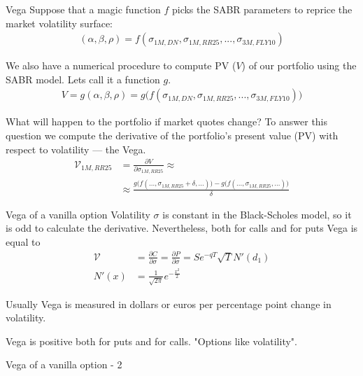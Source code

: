 \documentclass{beamer}
\begin{document}
\begin{frame}{Vega}
\justify
Suppose that a magic function $f$ picks the SABR parameters to reprice the market volatility surface:
\begin{align*}
(\alpha, \beta, \rho) = f(\sigma_{1M,DN}, \sigma_{1M,RR25}, ..., \sigma_{3M,FLY10})
\end{align*}

\justify
We also have a numerical procedure to compute PV ($V$) of our portfolio using the SABR model. Lets call it a function $g$.
\begin{align*}
V = g(\alpha, \beta, \rho) = g\Big(f(\sigma_{1M,DN}, \sigma_{1M,RR25}, ..., \sigma_{3M,FLY10})\Big)
\end{align*}

\justify
What will happen to the portfolio if market quotes change? To answer this question we compute the derivative of the portfolio's present value (PV) with respect to volatility --- the \alert{Vega}.
\begin{align*}
\mathcal{V}_{1M,RR25} &= \frac{\partial V}{\partial \sigma_{1M,RR25}} \approx \\
&\approx \frac{g\Big(f(...,\sigma_{1M,RR25}+\delta,...)\Big) - g\Big(f(...,\sigma_{1M,RR25},...)\Big)}{\delta}
\end{align*}
\end{frame}



\begin{frame}{Vega of a vanilla option}
\justify
Volatility $\sigma$ is constant in the Black-Scholes model, so it is odd to calculate the derivative. Nevertheless, both for calls and for puts Vega is equal to
\begin{align*}
\mathcal{V} &= \frac{\partial C}{\partial \sigma} = \frac{\partial P}{\partial \sigma} = Se^{-qT}\sqrt{T}N'(d_1) \\
N'(x) &= \frac{1}{\sqrt{2\pi}}e^{-\frac{x^2}{2}}
\end{align*}

\justify
Usually Vega is measured in dollars or euros per percentage point change in volatility.

\justify
Vega is positive both for puts and for calls. "Options like volatility".
\end{frame}



\begin{frame}{Vega of a vanilla option - 2}
\centering
{}
\end{frame}
\end{document}

